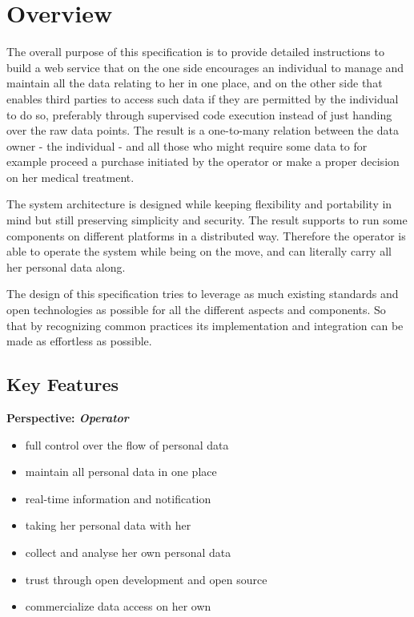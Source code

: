 \documentclass[12pt,english,a4paper,titlepage,cleardoublepage=empty,dottedtoc]{report}
\providecommand{\tightlist}{%
  \setlength{\itemsep}{0pt}\setlength{\parskip}{0pt}}
\begin{document}
\section{Overview}\label{overview}

The overall purpose of this specification is to provide detailed
instructions to build a web service that on the one side encourages an
individual to manage and maintain all the data relating to her in one
place, and on the other side that enables third parties to access such
data if they are permitted by the individual to do so, preferably
through supervised code execution instead of just handing over the raw
data points. The result is a one-to-many relation between the data owner
- the individual - and all those who might require some data to for
example proceed a purchase initiated by the operator or make a proper
decision on her medical treatment.

The system architecture is designed while keeping flexibility and
portability in mind but still preserving simplicity and security. The
result supports to run some components on different platforms in a
distributed way. Therefore the operator is able to operate the system
while being on the move, and can literally carry all her personal data
along.

The design of this specification tries to leverage as much existing
standards and open technologies as possible for all the different
aspects and components. So that by recognizing common practices its
implementation and integration can be made as effortless as possible.

\subsection*{Key Features}\label{key-features}

\textbf{Perspective: \emph{Operator}}

\begin{itemize}
\tightlist
\item
  full control over the flow of personal data
\item
  maintain all personal data in one place
\item
  real-time information and notification
\item
  taking her personal data with her
\item
  collect and analyse her own personal data
\item
  trust through open development and open source
\item
  commercialize data access on her own
\end{itemize}
\end{document}
